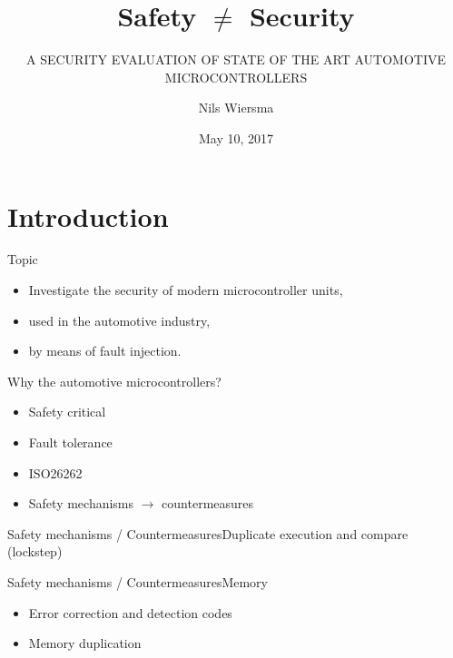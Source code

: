 \documentclass[table]{beamer}
\title{Safety $\neq$ Security}
\subtitle{A SECURITY EVALUATION OF STATE OF THE ART AUTOMOTIVE MICROCONTROLLERS}
\date{May 10, 2017}
\author{Nils Wiersma}
\begin{document}
\begin{frame}
    \titlepage
\end{frame}

\begin{frame}
    \tableofcontents
\end{frame}

\section{Introduction}

\begin{frame}
    \tableofcontents[currentsection]
\end{frame}


\begin{frame}{Topic}
    \begin{itemize}
        \item[] Investigate the security of modern microcontroller units, 
            \item[] used in the automotive industry, 
            \item[] by means of fault injection.
    \end{itemize}
\end{frame}

\begin{frame}{Why the automotive microcontrollers?}
    
    \begin{itemize}
        \item Safety critical
        \item Fault tolerance
        \item ISO26262
        \item Safety mechanisms $\rightarrow$ countermeasures
    \end{itemize}
\end{frame}

\begin{frame}{Safety mechanisms / Countermeasures}{Duplicate execution and compare (lockstep)}
    \begin{figure}[H]
      \centering
      \def\svgwidth{\columnwidth}
      
      \label{fig:lockstepdiagram}
    \end{figure}
\end{frame}

\begin{frame}{Safety mechanisms / Countermeasures}{Memory}
    \begin{itemize}
        \item Error correction and detection codes
        \item Memory duplication
    \end{itemize}
\end{frame}
\end{document}
